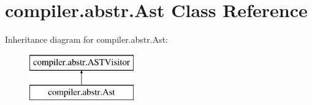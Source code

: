 \hypertarget{classcompiler_1_1abstr_1_1_ast}{}\section{compiler.\+abstr.\+Ast Class Reference}
\label{classcompiler_1_1abstr_1_1_ast}
Inheritance diagram for compiler.\+abstr.\+Ast\+:\begin{figure}[H]
\begin{center}
\leavevmode
\includegraphics[height=2.000000cm]{classcompiler_1_1abstr_1_1_ast}
\end{center}
\end{figure}
